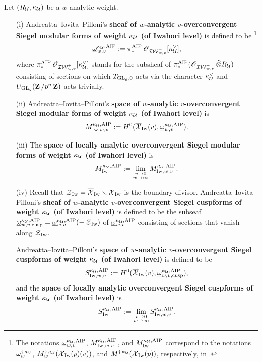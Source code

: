 \begin{Definition}\label{definition: automorphic sheaves of AIP}
Let $(R_{\calU}, \kappa_{\calU})$ be a $w$-analytic weight. 
\begin{enumerate}
\item[(i)] Andreatta--Iovita--Pilloni's \textbf{sheaf of $w$-analytic $v$-overconvergent Siegel modular forms of weight $\kappa_{\calU}$ (of Iwahori level)} is defined to be \footnote{The notations $\underline{\omega}_{w, v}^{\kappa_{\calU}, \AIP}$, $M^{\kappa_{\calU}, \AIP}_{\Iw, w,v}$, and $M^{\kappa_{\calU}, \AIP}_{\Iw}$ correspond to the notations $\omega^{\dagger\, \kappa_{\calU}}_w$, $M^{\dagger\,\kappa_{\calU}}_w(\calX_{\Iw}(p)(v))$, and $M^{\dagger\,\kappa_{\calU}}(\calX_{\Iw}(p))$, respectively, in \cite{AIP-2015}.}
$$\underline{\omega}_{w, v}^{\kappa_{\calU}, \AIP}:=\pi_{*}^{\AIP}\scrO_{\adicIW_{w,v}^+}[\kappa_{\calU}^{\vee}],$$ 
where $\pi_{*}^{\AIP}\scrO_{\adicIW_{w,v}^+}[\kappa_{\calU}^{\vee}]$ stands for the subsheaf of $\pi_{*}^{\AIP}(\scrO_{\adicIW_{w,v}^+}\widehat{\otimes}R_{\calU})$ consisting of sections on which $T_{\GL_g,0}$ acts via the character $\kappa_{\calU}^{\vee}$ and $U_{\GL_g}(\Z/p^n\Z)$ acts trivially. 
\item[(ii)] Andreatta--Iovita--Pilloni's \textbf{space of $w$-analytic $v$-overconvergent Siegel modular forms of weight $\kappa_{\calU}$ (of Iwahori level)} is 
$$M^{\kappa_{\calU}, \AIP}_{\Iw, w,v}:=H^0(\overline{\calX}_{\Iw}(v), \underline{\omega}_{w, v}^{\kappa_{\calU}, \AIP}).$$
\item[(iii)]The \textbf{space of locally analytic overconvergent Siegel modular forms of weight $\kappa_{\calU}$ (of Iwahori level)} is
$$M^{\kappa_{\calU}, \AIP}_{\Iw}:=\lim_{\substack{v\rightarrow 0\\ w\rightarrow\infty}}M^{\kappa_{\calU}, \AIP}_{\Iw, w, v}.$$
\item[(iv)] Recall that $\calZ_{\Iw} = \overline{\calX}_{\Iw}\smallsetminus \calX_{\Iw}$ is the boundary divisor. Andreatta--Iovita--Pilloni's \textbf{sheaf of $w$-analytic $v$-overconvergent Siegel cuspforms of weight $\kappa_{\calU}$ (of Iwahori level)} is defined to be the subseaf $\underline{\omega}_{w, v, \cusp}^{\kappa_{\calU}, \AIP} = \underline{\omega}_{w, v}^{\kappa_{\calU}, \AIP}(-\calZ_{\Iw})$ of $\underline{\omega}_{w, v}^{\kappa_{\calU}, \AIP}$ consisting of sections that vanish along $\calZ_{\Iw}$. 

Andreatta--Iovita--Pilloni's \textbf{space of $w$-analytic $v$-overconvergent Siegel cuspforms of weight $\kappa_{\calU}$ (of Iwahori level)} is defined to be \[
    S_{\Iw, w, v}^{\kappa_{\calU}, \AIP} := H^0(\overline{\calX}_{\Iw}(v), \underline{\omega}_{w, v, \cusp}^{\kappa_{\calU}, \AIP}),
\] and the \textbf{space of locally analytic overconvergent Siegel cuspforms of weight $\kappa_{\calU}$ (of Iwahori level)} is \[
    S_{\Iw}^{\kappa_{\calU}, \AIP} := \lim_{\substack{v\rightarrow 0 \\ w \rightarrow \infty}} S_{\Iw, w, v}^{\kappa_{\calU}, \AIP}.
\]
\end{enumerate}
\end{Definition}

